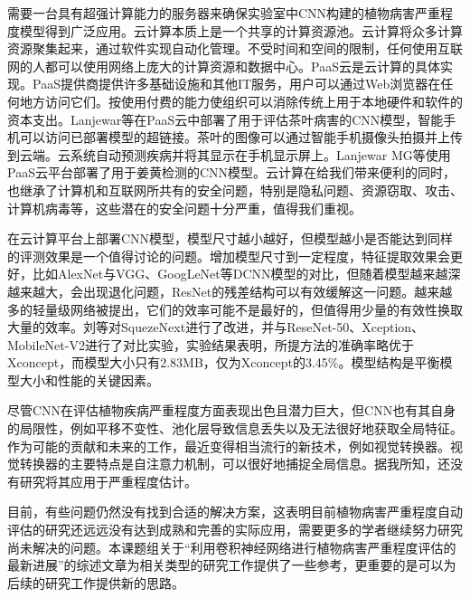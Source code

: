 需要一台具有超强计算能力的服务器来确保实验室中CNN构建的植物病害严重程度模型得到广泛应用。云计算本质上是一个共享的计算资源池。云计算将众多计算资源聚集起来，通过软件实现自动化管理。不受时间和空间的限制，任何使用互联网的人都可以使用网络上庞大的计算资源和数据中心。PaaS云是云计算的具体实现。PaaS提供商提供许多基础设施和其他IT服务，用户可以通过Web浏览器在任何地方访问它们。按使用付费的能力使组织可以消除传统上用于本地硬件和软件的资本支出。Lanjewar等在PaaS云中部署了用于评估茶叶病害的CNN模型，智能手机可以访问已部署模型的超链接。茶叶的图像可以通过智能手机摄像头拍摄并上传到云端。云系统自动预测疾病并将其显示在手机显示屏上。Lanjewar MG等使用PaaS云平台部署了用于姜黄检测的CNN模型。云计算在给我们带来便利的同时，也继承了计算机和互联网所共有的安全问题，特别是隐私问题、资源窃取、攻击、计算机病毒等，这些潜在的安全问题十分严重，值得我们重视。

在云计算平台上部署CNN模型，模型尺寸越小越好，但模型越小是否能达到同样的评测效果是一个值得讨论的问题。增加模型尺寸到一定程度，特征提取效果会更好，比如AlexNet与VGG、GoogLeNet等DCNN模型的对比，但随着模型越来越深越来越大，会出现退化问题，ResNet的残差结构可以有效缓解这一问题。越来越多的轻量级网络被提出，它们的效率可能不是最好的，但值得用少量的有效性换取大量的效率。刘等对SquezeNext进行了改进，并与ReseNet-50、Xception、MobileNet-V2进行了对比实验，实验结果表明，所提方法的准确率略优于Xconcept，而模型大小只有2.83MB，仅为Xconcept的3.45\%。模型结构是平衡模型大小和性能的关键因素。

尽管CNN在评估植物疾病严重程度方面表现出色且潜力巨大，但CNN也有其自身的局限性，例如平移不变性、池化层导致信息丢失以及无法很好地获取全局特征。作为可能的贡献和未来的工作，最近变得相当流行的新技术，例如视觉转换器。视觉转换器的主要特点是自注意力机制，可以很好地捕捉全局信息。据我所知，还没有研究将其应用于严重程度估计。

目前，有些问题仍然没有找到合适的解决方案，这表明目前植物病害严重程度自动评估的研究还远远没有达到成熟和完善的实际应用，需要更多的学者继续努力研究尚未解决的问题。本课题组关于“利用卷积神经网络进行植物病害严重程度评估的最新进展”的综述文章为相关类型的研究工作提供了一些参考，更重要的是可以为后续的研究工作提供新的思路。
